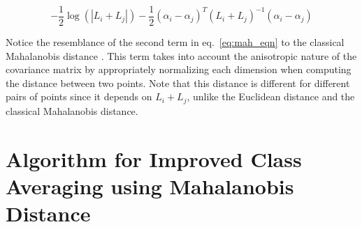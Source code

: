 \begin{equation}\label{eq:mah_eqn}
 -\frac{1}{2}\log(|L_i + L_j|) -\frac{1}{2}(\alpha_i - \alpha_j)^T(L_i+L_j)^{-1}(\alpha_i -\alpha_j)
\end{equation}

Notice the resemblance of the second term in eq.~\eqref{eq:mah_eqn} to the classical Mahalanobis distance \cite{mah}. This term takes into account the anisotropic nature of the covariance matrix by appropriately normalizing each dimension when computing the distance between two points. Note that this distance is different for different pairs of points since it depends on $L_i + L_j$, unlike the Euclidean distance and the classical Mahalanobis distance. 

\section{Algorithm for Improved Class Averaging using Mahalanobis Distance}

